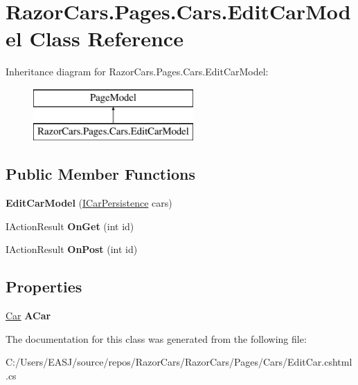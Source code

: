 \hypertarget{class_razor_cars_1_1_pages_1_1_cars_1_1_edit_car_model}{}\section{Razor\+Cars.\+Pages.\+Cars.\+Edit\+Car\+Model Class Reference}
\label{class_razor_cars_1_1_pages_1_1_cars_1_1_edit_car_model}
Inheritance diagram for Razor\+Cars.\+Pages.\+Cars.\+Edit\+Car\+Model\+:\begin{figure}[H]
\begin{center}
\leavevmode
\includegraphics[height=2.000000cm]{class_razor_cars_1_1_pages_1_1_cars_1_1_edit_car_model}
\end{center}
\end{figure}
\subsection*{Public Member Functions}
\begin{DoxyCompactItemize}
\item 
\mbox{\label{class_razor_cars_1_1_pages_1_1_cars_1_1_edit_car_model_a02a8598532179e43027da096395aa9d7}} 
{\bfseries Edit\+Car\+Model} (\mbox{\hyperlink{interface_razor_cars_1_1services_1_1_i_car_persistence}{I\+Car\+Persistence}} cars)
\item 
\mbox{\label{class_razor_cars_1_1_pages_1_1_cars_1_1_edit_car_model_a9238e51264143e55f5e1f16e2252f767}} 
I\+Action\+Result {\bfseries On\+Get} (int id)
\item 
\mbox{\label{class_razor_cars_1_1_pages_1_1_cars_1_1_edit_car_model_a5154fd1cb17e95de9b3f275d259f09e8}} 
I\+Action\+Result {\bfseries On\+Post} (int id)
\end{DoxyCompactItemize}
\subsection*{Properties}
\begin{DoxyCompactItemize}
\item 
\mbox{\label{class_razor_cars_1_1_pages_1_1_cars_1_1_edit_car_model_a057916454313e69cde104c693a24a469}} 
\mbox{\hyperlink{class_razor_cars_1_1model_1_1_car}{Car}} {\bfseries A\+Car}
\end{DoxyCompactItemize}


The documentation for this class was generated from the following file\+:\begin{DoxyCompactItemize}
\item 
C\+:/\+Users/\+E\+A\+S\+J/source/repos/\+Razor\+Cars/\+Razor\+Cars/\+Pages/\+Cars/Edit\+Car.\+cshtml.\+cs\end{DoxyCompactItemize}
